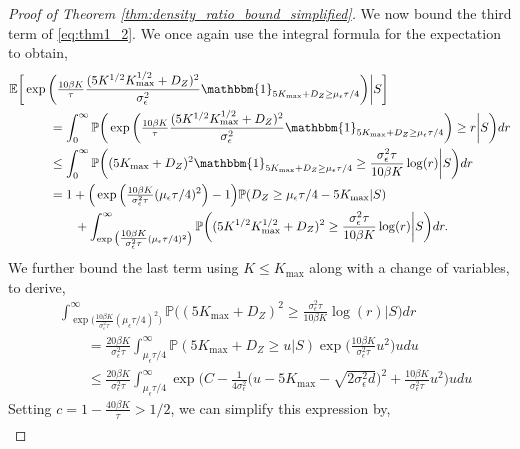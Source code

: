 \documentclass[10pt]{article}
\theoremstyle{plain}
\theoremstyle{definition}
\theoremstyle{remark}
\newcommand{\E}{\mathbb{E}}
\newcommand{\prob}{\mathbb{P}}
\begin{document}
\begin{proof}[Proof of Theorem \ref{thm:density_ratio_bound_simplified}]
We now bound the third term of \eqref{eq:thm1_2}. We once again use the integral formula for the expectation to obtain,
\begin{align}
    \E \bigg [ & \exp \bigg ( \tfrac{10\beta K}{\tau} \frac{(5 K^{1/2} K_{\max}^{1/2} + D_Z)^2}{\sigma^2_\epsilon} \mathbbm{1}_{5 K_{\max} + D_Z \geq \mu_\epsilon \tau / 4} \bigg ) \bigg | S \bigg ]\nonumber\\
    &\qquad = \int_0^\infty \prob \bigg ( \exp \bigg ( \tfrac{10\beta K}{\tau} \frac{(5 K^{1/2} K_{\max}^{1/2} + D_Z)^2}{\sigma^2_\epsilon} \mathbbm{1}_{5 K_{\max} + D_Z \geq \mu_\epsilon \tau / 4} \bigg ) \geq r \bigg | S \bigg ) dr\nonumber\\
    &\qquad \leq \int_0^\infty \prob \bigg ( (5 K_{\max} + D_Z)^2 \mathbbm{1}_{5 K_{\max} + D_Z \geq \mu_\epsilon \tau / 4} \geq  \frac{\sigma^2_\epsilon \tau}{10\beta K} \log(r) \bigg | S \bigg ) dr\nonumber\\
    &\qquad = 1 + \Big ( \exp \Big ( \tfrac{10\beta K}{\sigma^2_\epsilon \tau}(\mu_\epsilon \tau/4)^2 \Big ) - 1 \Big ) \prob ( D_Z \geq \mu_\epsilon \tau/4 - 5 K_{\max} | S ) \nonumber\\
    &\qquad \qquad + \int_{\exp \big ( \tfrac{10\beta K}{\sigma^2_\epsilon \tau}(\mu_\epsilon \tau/4)^2 \big )}^\infty \prob \bigg ( (5 K^{1/2} K_{\max}^{1/2} + D_Z)^2 \geq \frac{\sigma^2_\epsilon \tau}{10\beta K} \log(r) \bigg | S \bigg ) dr.\label{eq:thm1_6}
\end{align}
We further bound the last term using \(K \leq K_{\max}\) along with a change of variables, to derive,
\begin{align*}
    &\int_{\exp \big ( \tfrac{10\beta K}{\sigma^2_\epsilon \tau}( \mu_\epsilon \tau/4)^2 \big )}^\infty \prob \bigg ( (5 K_{\max} + D_Z)^2 \geq \frac{\sigma^2_\epsilon \tau}{10\beta K} \log(r) \bigg | S \bigg ) dr\\
    &\qquad = \frac{20\beta K} {\sigma^2_\epsilon \tau}\int_{\mu_\epsilon \tau/4}^\infty \prob  ( 5 K_{\max} + D_Z \geq u | S ) \exp \bigg ( \frac{10\beta K}{\sigma^2_\epsilon \tau} u^2 \bigg ) u du\\
    &\qquad \leq \frac{20\beta K} {\sigma^2_\epsilon \tau}\int_{\mu_\epsilon \tau/4}^\infty \exp \bigg ( C - \frac{1}{4 \sigma_\epsilon^2} \big ( u - 5 K_{\max} - \sqrt{2 \sigma_\epsilon^2 d} \big )^2 + \frac{10\beta K}{\sigma^2_\epsilon \tau} u^2 \bigg )u du
\end{align*}
Setting \(c = 1 - \frac{40\beta K}{\tau} > 1/2\), we can simplify this expression by,
\begin{align*}

\end{align*}
\end{proof}
\end{document}
